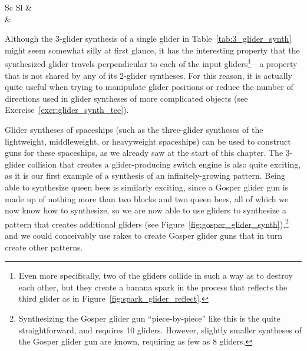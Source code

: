 \begin{table}[!htp]
\begin{center}
\begin{tabular}{Sc Sl}
			  &  \\
			
			 &  \\\bottomrule
		\end{tabular}
		\caption{A selection of useful $3$-glider syntheses. The $3$-glider collision that creates a glider-producing switch engine is not a true glider synthesis due to the fact that it also creates a wide assortment of other debris, but it is nonetheless noteworthy for being the only known way of generating infinite growth with just $3$ gliders.}\label{tab:3_glider_synth}
	\end{center}
\end{table}

Although the $3$-glider synthesis of a single glider in Table~\ref{tab:3_glider_synth} might seem somewhat silly at first glance, it has the interesting property that the synthesized glider travels perpendicular to each of the input gliders\footnote{Even more specifically, two of the gliders collide in such a way as to destroy each other, but they create a banana spark in the process that reflects the third glider as in Figure~\ref{fig:spark_glider_reflect}.}---a property that is not shared by any of its $2$-glider syntheses. For this reason, it is actually quite useful when trying to manipulate glider positions or reduce the number of directions used in glider syntheses of more complicated objects (see Exercise~\ref{exer:glider_synth_tee}).

Glider syntheses of spaceships (such as the three-glider syntheses of the lightweight, middleweight, or heavyweight spaceships) can be used to construct guns for these spaceships, as we already saw at the start of this chapter. The $3$-glider collision that creates a glider-producing switch engine is also quite exciting, as it is our first example of a synthesis of an infinitely-growing pattern. Being able to synthesize queen bees is similarly exciting, since a Gosper glider gun is made up of nothing more than two blocks and two queen bees, all of which we now know how to synthesize, so we are now able to use gliders to synthesize a pattern that creates additional gliders (see Figure~\ref{fig:gosper_glider_synth}),\footnote{Synthesizing the Gosper glider gun ``piece-by-piece'' like this is the quite straightforward, and requires 10 gliders. However, slightly smaller syntheses of the Gosper glider gun are known, requiring as few as 8 gliders.} and we could conceivably use rakes to create Gosper glider guns that in turn create other patterns.

